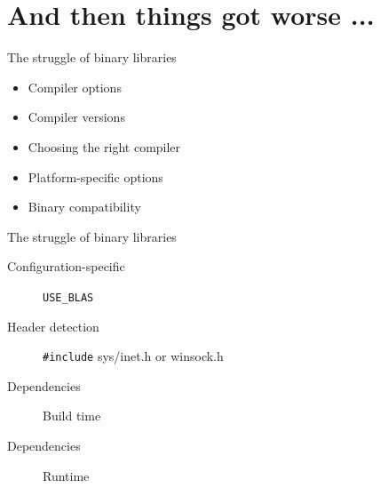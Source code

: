 \documentclass[pdf]{beamer}
\begin{document}
\section{And then things got worse ...}

\begin{frame}{The struggle of binary libraries}
    \begin{itemize}
        \item Compiler options
        \item Compiler versions
        \item Choosing the right compiler
        \item Platform-specific options
        \item Binary compatibility
    \end{itemize}
\end{frame}

\begin{frame}[fragile]{The struggle of binary libraries}
    \begin{description}
        \item [Configuration-specific] \verb|USE_BLAS|
        \item [Header detection] \verb|#include| sys/inet.h or winsock.h
        \item [Dependencies] Build time
        \item [Dependencies] Runtime
    \end{description}

\end{frame}

\begin{frame}
    \inputminted{c++}{my-package/template-div1.cpp}
\end{frame}
\end{document}
